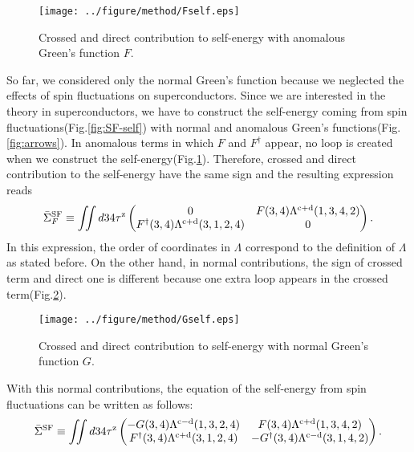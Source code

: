\begin{figure}[h] %
	\centering
	\texttt{[image: ../figure/method/Fself.eps]}
	\caption{Crossed and direct contribution to self-energy with anomalous Green's function $F$.}
	\label{fig:Fself}
\end{figure}
So far, we considered only the normal Green's function because
we neglected the effects of spin fluctuations on superconductors.
Since we are interested in the theory in superconductors, we have to 
construct the self-energy coming from spin fluctuations(Fig.\ref{fig:SF-self})
with normal and anomalous Green's functions(Fig.\ref{fig:arrows}).
In anomalous terms in which $F$ and $F^\dag$ appear, no loop is created
when we construct the self-energy(Fig.\ref{fig:Fself}).
Therefore, crossed and direct contribution to the self-energy have the 
same sign and the resulting expression reads
%
\begin{equation}
	\bar{\Sigma}^{\rm SF}_F \equiv \iint d34 \tau^{\rm z}
	\begin{pmatrix}
		0 & F(3,4)\Lambda^{\rm c + \rm d}(1,3,4,2) \\
		F^\dag(3,4)\Lambda^{\rm c + \rm d}(3,1,2,4) &0
	\end{pmatrix}.
	\label{eq:Fself}
\end{equation}
%
In this expression, the order of coordinates in $\Lambda$ correspond to the definition of $\Lambda$ as stated before.
On the other hand, in normal contributions, the sign of crossed term and
direct one is different because one extra loop appears in the crossed term(Fig.\ref{fig:Gself}).
%
\begin{figure}[h] %
	\centering
	\texttt{[image: ../figure/method/Gself.eps]}
	\caption{Crossed and direct contribution to self-energy with normal Green's function $G$.}
	\label{fig:Gself}
\end{figure}
%
With this normal contributions, the equation of the self-energy from spin fluctuations can be written as follows:
%
\begin{equation}
	\bar{\Sigma}^{\rm SF} \equiv \iint d34 \tau^{\rm z}
	\begin{pmatrix}
		-G(3,4)\Lambda^{\rm c - \rm d}(1,3,2,4) & F(3,4)\Lambda^{\rm c + \rm d}(1,3,4,2) \\
		F^\dag(3,4)\Lambda^{\rm c + \rm d}(3,1,2,4) & -G^\dag(3,4)\Lambda^{\rm c - \rm d}(3,1,4,2)
	\end{pmatrix}.
	\label{eq:GFself}
\end{equation}
%

